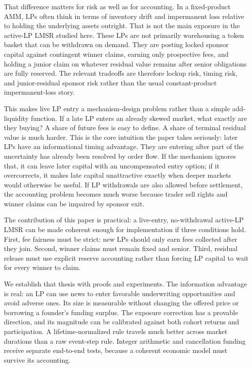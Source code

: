 \documentclass[10pt]{article}
\begin{document}
That difference matters for risk as well as for accounting. In a fixed-product AMM, LPs often think in terms of inventory drift and impermanent loss relative to holding the underlying assets outright. That is not the main exposure in the active-LP LMSR studied here. These LPs are not primarily warehousing a token basket that can be withdrawn on demand. They are posting locked sponsor capital against contingent winner claims, earning only prospective fees, and holding a junior claim on whatever residual value remains after senior obligations are fully reserved. The relevant tradeoffs are therefore lockup risk, timing risk, and junior-residual sponsor risk rather than the usual constant-product impermanent-loss story.

This makes live LP entry a mechanism-design problem rather than a simple add-liquidity function. If a late LP enters an already skewed market, what exactly are they buying? A share of future fees is easy to define. A share of terminal residual value is much harder. This is the core intuition the paper takes seriously: later LPs have an informational timing advantage. They are entering after part of the uncertainty has already been resolved by order flow. If the mechanism ignores that, it can leave later capital with an uncompensated entry option; if it overcorrects, it makes late capital unattractive exactly when deeper markets would otherwise be useful. If LP withdrawals are also allowed before settlement, the accounting problem becomes much worse because trader sell rights and winner claims can be impaired by sponsor exit.

The contribution of this paper is practical: a live-entry, no-withdrawal active-LP LMSR can be made coherent enough for implementation if three conditions hold. First, fee fairness must be strict: new LPs should only earn fees collected after they join. Second, winner claims must remain fixed and senior. Third, residual release must use explicit reserve accounting rather than forcing LP capital to wait for every winner to claim.

We establish that thesis with proofs and experiments. The information advantage is real: an LP can use news to enter favorable underwriting opportunities and avoid adverse ones. Its size is measurable without changing the offered price or borrowing a founder's funding surplus. The exposure correction has a provable direction, and its magnitude can be calibrated against both cohort returns and participation. A lifetime-normalized rule travels much better across market durations than a raw event-step rule. Integer arithmetic and cancellation funding receive separate end-to-end tests, because a coherent economic model must survive its accounting.
\end{document}
